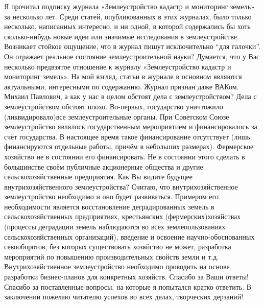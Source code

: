 \begin{drama}
	\maxspeaks Я прочитал подписку журнала «Землеустройство кадастр и мониторинг земель» за несколько лет. Среди статей, опубликованных в этих журналах, было только несколько, написанных интересно, и ни одной, в которой содержались бы хоть сколько-нибудь новые идеи или значимые исследования в землеустройстве. Возникает стойкое ощущение, что в журнал пишут исключительно “для галочки”. Он отражает реальное состояние землеустроительной науки?
	\michaelspeaks Думается, что у Вас несколько предвзятое отношение к журналу «Землеустройство кадастр и мониторинг земель». На мой взгляд, статьи в журнале в основном являются актуальными, интересными по содержанию. Журнал признан даже ВАКом. 
	\maxspeaks Михаил Павлович, а как у нас в целом обстоят дела с землеустройством?
	\michaelspeaks Дела с землеустройством обстоят плохо. Во-первых, государство уничтожило (ликвидировало)все землеустроительные органы. При Советском Союзе землеустройство являлось государственным мероприятием и финансировалось за счёт государства. В настоящее время такое финансирование отсутствует (лишь финансируются отдельные работы, причём в небольших размерах). Фермерское хозяйство не в состоянии его финансировать. Не в состоянии этого сделать в большинстве своём публичные акционерные общества и другие сельскохозяйственные предприятия.
	\maxspeaks Как Вы видите будущее внутрихозяйственного землеустройства?
	\michaelspeaks Считаю, что внутрихозяйственное землеустройство необходимо и оно будет развиваться. Примером его необходимости является восстановление деградированных земель в сельскохозяйственных предприятиях, крестьянских (фермерских)хозяйствах (процессы деградации земель наблюдаются во всех землепользованиях сельскохозяйственных организаций), введение и освоение научно-обоснованных севооборотов, без которых существовать хозяйство не может, разработка мероприятий по повышению производительных свойств земли и т.д. Внутрихозяйственное землеустройство необходимо проводить на основе разработки бизнес-планов для конкретных хозяйств.
	\maxspeaks Спасибо за Ваши ответы!
	\michaelspeaks Спасибо за поставленные вопросы, на которые я попытался кратко ответить. В заключении пожелаю читателю успехов во всех делах, творческих дерзаний!


\end{drama}
